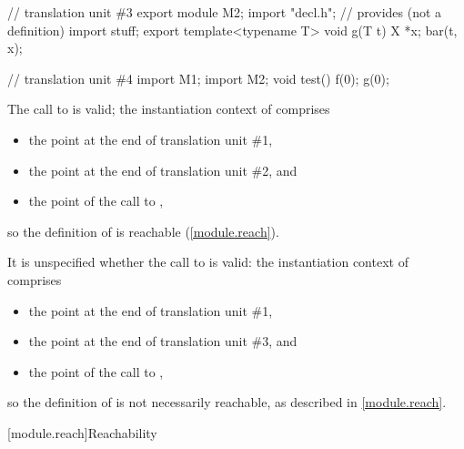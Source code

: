 \begin{std.txt}
\begin{example}
\begin{codeblock}
// translation unit \#3
export module M2;
import "decl.h";        // provides  (not a definition)
import stuff;
export template<typename T> void g(T t) {
  X *x;
  bar(t, x);
}

// translation unit \#4
import M1;
import M2;
void test() {
  f(0);
  g(0);
}
\end{codeblock}
The call to  is valid;
the instantiation context of  comprises
\begin{itemize}
\item the point at the end of translation unit \#1,
\item the point at the end of translation unit \#2, and
\item the point of the call to ,
\end{itemize}
so the definition of  is reachable (\ref{module.reach}).

It is unspecified whether the call to  is valid:
the instantiation context of  comprises
\begin{itemize}
\item the point at the end of translation unit \#1,
\item the point at the end of translation unit \#3, and
\item the point of the call to ,
\end{itemize}
so the definition of  is not necessarily reachable,
as described in \ref{module.reach}.
\end{example}
\end{std.txt}

[module.reach]{Reachability}

